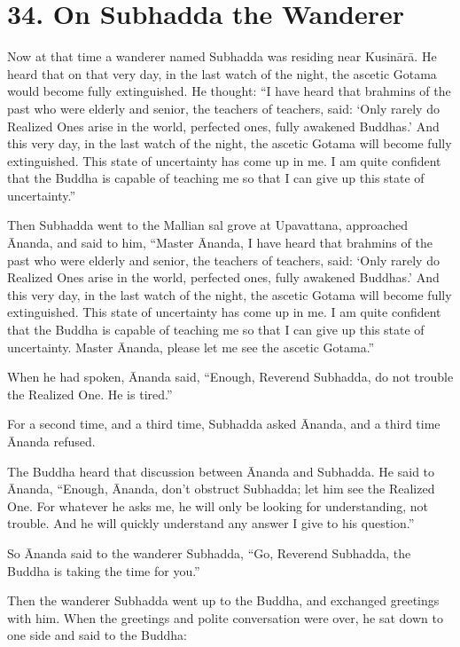 \documentclass[12pt,openany]{book}%
\begin{document}
\section*{34. On Subhadda the Wanderer }

Now at that time a wanderer named Subhadda was residing near \textsanskrit{Kusinārā}. He heard that on that very day, in the last watch of the night, the ascetic Gotama would become fully extinguished. He thought: “I have heard that brahmins of the past who were elderly and senior, the teachers of teachers, said: ‘Only rarely do Realized Ones arise in the world, perfected ones, fully awakened Buddhas.’ And this very day, in the last watch of the night, the ascetic Gotama will become fully extinguished. This state of uncertainty has come up in me. I am quite confident that the Buddha is capable of teaching me so that I can give up this state of uncertainty.” 

Then Subhadda went to the Mallian sal grove at Upavattana, approached Ānanda, and said to him, “Master Ānanda, I have heard that brahmins of the past who were elderly and senior, the teachers of teachers, said: ‘Only rarely do Realized Ones arise in the world, perfected ones, fully awakened Buddhas.’ And this very day, in the last watch of the night, the ascetic Gotama will become fully extinguished. This state of uncertainty has come up in me. I am quite confident that the Buddha is capable of teaching me so that I can give up this state of uncertainty. Master Ānanda, please let me see the ascetic Gotama.” 

When he had spoken, Ānanda said, “Enough, Reverend Subhadda, do not trouble the Realized One. He is tired.” 

For a second time, and a third time, Subhadda asked Ānanda, and a third time Ānanda refused. 

The Buddha heard that discussion between Ānanda and Subhadda. He said to Ānanda, “Enough, Ānanda, don’t obstruct Subhadda; let him see the Realized One. For whatever he asks me, he will only be looking for understanding, not trouble. And he will quickly understand any answer I give to his question.” 

So Ānanda said to the wanderer Subhadda, “Go, Reverend Subhadda, the Buddha is taking the time for you.” 

Then the wanderer Subhadda went up to the Buddha, and exchanged greetings with him. When the greetings and polite conversation were over, he sat down to one side and said to the Buddha: 
\end{document}
